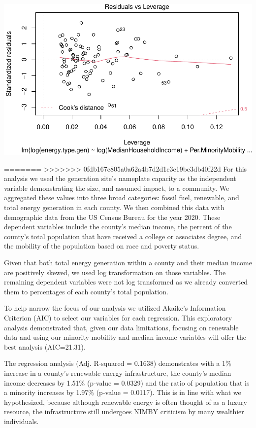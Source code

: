 \documentclass[
  12pt,
]{article}
\begin{document}
\includegraphics{Project_files/figure-latex/unnamed-chunk-6-4.pdf}

=======
>>>>>>> 0fdb167c805a0a62a4b7d2d1c3c19be3db40f22d
For this analysis we used the generation site's nameplate capacity as
the independent variable demonstrating the size, and assumed impact, to
a community. We aggregated these values into three broad categories:
fossil fuel, renewable, and total energy generation in each county. We
then combined this data with demographic data from the US Census Bureau
for the year 2020. These dependent variables include the county's median
income, the percent of the county's total population that have received
a college or associates degree, and the mobility of the population based
on race and poverty status.

Given that both total energy generation within a county and their median
income are positively skewed, we used log transformation on those
variables. The remaining dependent variables were not log transformed as
we already converted them to percentages of each county's total
population.

To help narrow the focus of our analysis we utilized Akaike's
Information Criterion (AIC) to select our variables for each regression.
This exploratory analysis demonstrated that, given our data limitations,
focusing on renewable data and using our minority mobility and median
income variables will offer the best analysis (AIC=21.31).

The regression analysis (Adj. R-squared = 0.1638) demonstrates with a
1\% increase in a county's renewable energy infrastructure, the county's
median income decreases by 1.51\% (p-value = 0.0329) and the ratio of
population that is a minority increases by 1.97\% (p-value = 0.0117).
This is in line with what we hypothesized, because although renewable
energy is often thought of as a luxury resource, the infrastructure
still undergoes NIMBY criticism by many wealthier individuals.
\end{document}
